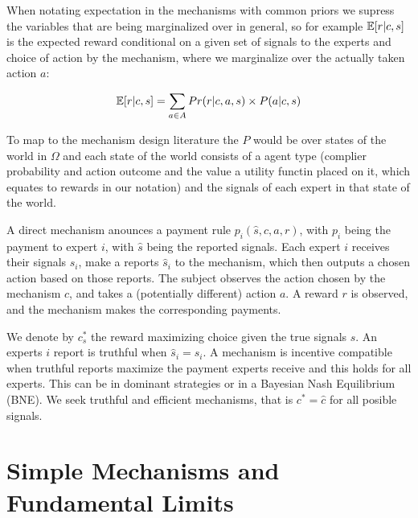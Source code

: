 When notating expectation in the mechanisms with common priors we supress the variables that are being marginalized over in general, so for example $\operatorname*{\mathbb E}[r|c,s]$ is the expected reward conditional on a given set of signals to the experts and choice of action by the mechanism, where we  marginalize over the actually taken action $a$:

\[
\operatorname*{\mathbb E}[r|c,s] = \sum_{a \in A} Pr(r|c,a,s) \times P(a|c,s) 
\]


To map to the mechanism design literature the $P$ would be over states of the world in $\Omega$ and each state of the world consists of a agent type (complier probability and action outcome and the value a utility functin placed on it, which equates to rewards in our notation) and the signals of each expert in that state of the world.



A direct mechanism anounces a payment rule $p_i(\hat{s}, c,a,r)$, with $p_i$ being the payment to expert $i$, with $\hat{s}$ being the reported signals. 
Each expert $i$ receives their signals $s_i$, make a reports $\hat{s}_i$ to the mechanism, which then outputs a chosen action based on those reports.
The subject observes the action chosen by the mechanism $c$, and takes a (potentially different) action $a$. A reward $r$ is observed, and the mechanism makes the corresponding payments.

We denote by $c^{*}_s$ the reward maximizing choice given the true signals $s$.
An experts $i$ report is truthful when $\hat{s}_i=s_i$. A mechanism is incentive compatible when truthful reports maximize the payment experts receive and this holds for all experts. This can be in dominant strategies or in a Bayesian Nash Equilibrium (BNE).  We seek truthful and efficient mechanisms, that is $c^{*} = \hat{c}$ for all posible signals.



\section{Simple Mechanisms and Fundamental Limits}

